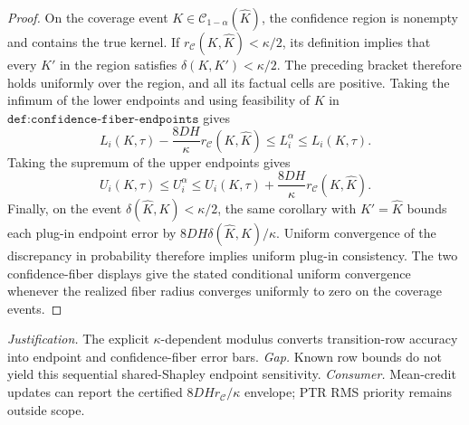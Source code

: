 \documentclass{article}
\begin{document}
\begin{proof}
On the coverage event \(K\in\mathcal C_{1-\alpha}(\widehat K)\), the confidence region is nonempty and contains the true kernel.  If \(r_{\mathcal C}(K,\widehat K)<\kappa/2\), its definition implies that every \(K'\) in the region satisfies \(\delta(K,K')<\kappa/2\).  The preceding bracket therefore holds uniformly over the region, and all its factual cells are positive.  Taking the infimum of the lower endpoints and using feasibility of \(K\) in \(\texttt{def:confidence-fiber-endpoints}\) gives
\[
 L_i(K,\tau)-\frac{8DH}{\kappa}r_{\mathcal C}(K,\widehat K)
 \le L_i^\alpha\le L_i(K,\tau).
\]
Taking the supremum of the upper endpoints gives
\[
 U_i(K,\tau)
 \le U_i^\alpha
 \le U_i(K,\tau)+\frac{8DH}{\kappa}r_{\mathcal C}(K,\widehat K).
\]
Finally, on the event \(\delta(\widehat K,K)<\kappa/2\), the same corollary with \(K'=\widehat K\) bounds each plug-in endpoint error by \(8DH\delta(\widehat K,K)/\kappa\).  Uniform convergence of the discrepancy in probability therefore implies uniform plug-in consistency.  The two confidence-fiber displays give the stated conditional uniform convergence whenever the realized fiber radius converges uniformly to zero on the coverage events.
\end{proof}
\par\smallskip\noindent \textit{Justification.} The explicit \(\kappa\)-dependent modulus converts transition-row accuracy into endpoint and confidence-fiber error bars. \textit{Gap.} Known row bounds do not yield this sequential shared-Shapley endpoint sensitivity. \textit{Consumer.} Mean-credit updates can report the certified \(8DHr_{\mathcal C}/\kappa\) envelope; PTR RMS priority remains outside scope.
\end{document}
